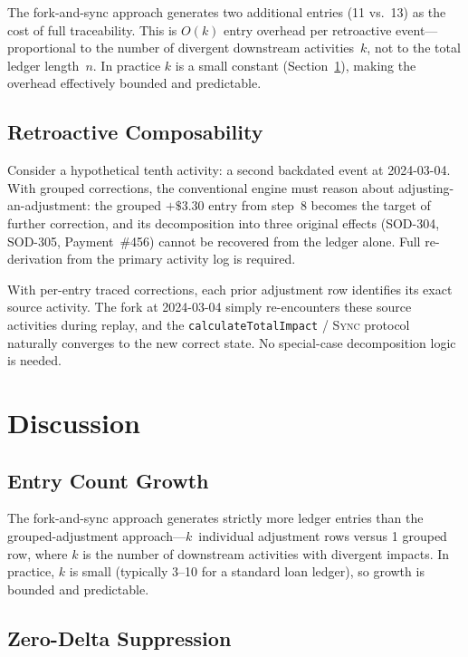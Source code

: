 \documentclass[11pt,letterpaper]{article}
\begin{document}
The fork-and-sync approach generates two additional entries (11 vs.\ 13)
as the cost of full traceability. This is $O(k)$ entry overhead per
retroactive event---proportional to the number of divergent downstream
activities~$k$, not to the total ledger length~$n$. In practice $k$ is
a small constant (Section~\ref{sec:discussion}), making the overhead
effectively bounded and predictable.

\subsection{Retroactive Composability}

Consider a hypothetical tenth activity: a second backdated event at
2024-03-04. With grouped corrections, the conventional engine must
reason about adjusting-an-adjustment: the grouped $+\$3.30$ entry from
step~8 becomes the target of further correction, and its decomposition
into three original effects (SOD-304, SOD-305, Payment~\#456) cannot be
recovered from the ledger alone. Full re-derivation from the primary
activity log is required.

With per-entry traced corrections, each prior adjustment row identifies
its exact source activity. The fork at 2024-03-04 simply re-encounters
these source activities during replay, and the
\texttt{calculateTotalImpact} / \textsc{Sync} protocol naturally
converges to the new correct state. No special-case decomposition logic
is needed.

\section{Discussion}
\label{sec:discussion}

\subsection{Entry Count Growth}

The fork-and-sync approach generates strictly more ledger entries than
the grouped-adjustment approach---$k$~individual adjustment rows versus
1 grouped row, where $k$ is the number of downstream activities with
divergent impacts. In practice, $k$ is small (typically 3--10 for a
standard loan ledger), so growth is bounded and predictable.

\subsection{Zero-Delta Suppression}
\end{document}
